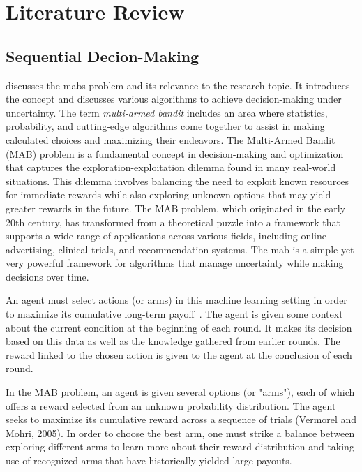 \section{Literature Review}
\label{sec:Literature Review} %

\subsection{Sequential Decion-Making}
\label{sub:lit-rev_sequential-decion} %

\Cite{slivkins:2024} discusses the \glspl{mab}  problem and its relevance to the research topic. It introduces the concept and discusses various algorithms to achieve decision-making under uncertainty. The term \emph{multi-armed bandit} includes an area where statistics, probability, and cutting-edge algorithms come together to assist in making calculated choices and maximizing their endeavors.
The Multi-Armed Bandit (MAB) problem is a fundamental concept in decision-making and optimization that captures the exploration-exploitation dilemma found in many real-world situations. This dilemma involves balancing the need to exploit known resources for immediate rewards while also exploring unknown options that may yield greater rewards in the future. The MAB problem, which originated in the early 20th century, has transformed from a theoretical puzzle into a framework that supports a wide range of applications across various fields, including online advertising, clinical trials, and recommendation systems. 
The \gls{mab} is a simple yet very powerful framework for algorithms that manage uncertainty while making decisions over time. 

An agent must select actions (or arms) in this machine learning setting in order to maximize its cumulative long-term payoff~\cite{zhao:2025}. The agent is given some context about the current condition at the beginning of each round. It makes its decision based on this data as well as the knowledge gathered from earlier rounds. The reward linked to the chosen action is given to the agent at the conclusion of each round.

In the MAB problem, an agent is given several options (or "arms"), each of which offers a reward selected from an unknown probability distribution. The agent seeks to maximize its cumulative reward across a sequence of trials (Vermorel and Mohri, 2005). In order to choose the best arm, one must strike a balance between exploring different arms to learn more about their reward distribution and taking use of recognized arms that have historically yielded large payouts.

